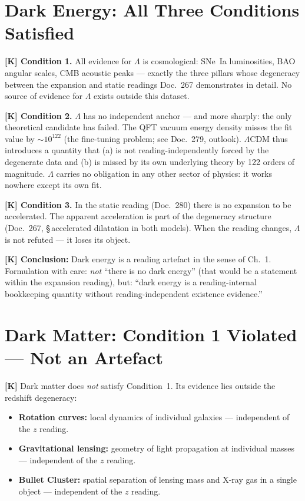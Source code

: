 \chapter{Dark Energy: All Three Conditions Satisfied}

\textbf{[K] Condition 1.} All evidence for $\Lambda$ is cosmological:
SNe~Ia luminosities, BAO angular scales, CMB acoustic peaks —
exactly the three pillars whose degeneracy between the expansion and
static readings Doc.~267 demonstrates in detail. No source of evidence
for $\Lambda$ exists outside this dataset.

\medskip
\textbf{[K] Condition 2.} $\Lambda$ has no independent anchor —
and more sharply: the only theoretical candidate has failed. The
QFT vacuum energy density misses the fit value by $\sim 10^{122}$
(the fine-tuning problem; see Doc.~279, outlook). $\Lambda$CDM thus
introduces a quantity that (a) is not reading-independently forced by
the degenerate data and (b) is missed by its own underlying theory by
122 orders of magnitude. $\Lambda$ carries no obligation in any other
sector of physics: it works nowhere except its own fit.

\medskip
\textbf{[K] Condition 3.} In the static reading (Doc.~280) there is
no expansion to be accelerated. The apparent acceleration is part of
the degeneracy structure (Doc.~267, §\,accelerated dilatation in both
models). When the reading changes, $\Lambda$ is not refuted — it loses
its object.

\medskip
\noindent\textbf{[K] Conclusion:} Dark energy is a reading artefact
in the sense of Ch.~1. Formulation with care: \emph{not} ``there is no
dark energy'' (that would be a statement within the expansion reading),
but: ``dark energy is a reading-internal bookkeeping quantity without
reading-independent existence evidence.''

\chapter{Dark Matter: Condition 1 Violated — Not an Artefact}

\textbf{[K]} Dark matter does \emph{not} satisfy Condition~1.
Its evidence lies outside the redshift degeneracy:

\begin{itemize}
  \item \textbf{Rotation curves:} local dynamics of individual galaxies
        — independent of the $z$ reading.
  \item \textbf{Gravitational lensing:} geometry of light propagation
        at individual masses — independent of the $z$ reading.
  \item \textbf{Bullet Cluster:} spatial separation of lensing mass
        and X-ray gas in a single object — independent of the $z$ reading.
\end{itemize}

